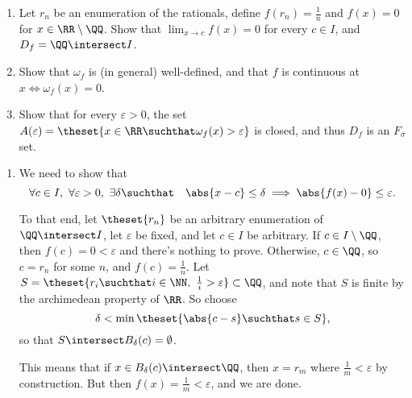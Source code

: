 \begin{problem}\hfill
\begin{enumerate}
  \item Let $r_n$ be an enumeration of the rationals, define $f(r_n) = \frac 1 n$ and $f(x) = 0$ for $x \in \RR\setminus\QQ$. Show that $\lim_{x \to c} f(x) = 0$ for every $c\in I$, and $D_f = \QQ \intersect I$.

  \item Show that $\omega_f$ is (in general) well-defined, and that $f$ is continuous at $x \iff \omega_f(x) = 0$.

  \item Show that for every $\varepsilon > 0$, the set $A(\varepsilon) = \theset{x\in\RR \suchthat \omega_f(x) > \varepsilon}$ is closed, and thus $D_f$ is an $F_\sigma$ set.
\end{enumerate}
\end{problem}


\begin{solution}\hfill
\begin{enumerate}
  \item We need to show that
    $$
    \forall c\in I, ~\forall\varepsilon > 0, ~\exists \delta \suchthat \quad \abs{x-c} \leq \delta \implies \abs{f(x) - 0} \leq \varepsilon.
    $$

    To that end, let $\theset{r_n}$ be an arbitrary enumeration of $\QQ \intersect I$, let $\varepsilon$ be fixed, and let $c \in I$ be arbitrary. If $c\in I\setminus\QQ$, then $f(c) = 0 < \varepsilon$ and there's nothing to prove. Otherwise, $c\in\QQ$, so $c = r_n$ for some $n$, and $f(c) = \frac 1 n$. Let $S = \theset{r_i \suchthat i \in \NN,~ \frac 1 i > \varepsilon} \subset \QQ$, and note that $S$ is finite by the archimedean property of $\RR$. So choose
    $$
    \delta < \min\theset{\abs{c - s} \suchthat s\in S},
    $$
    so that $S \intersect B_\delta(c) = \emptyset$.

    This means that if $x\in B_\delta(c) \intersect \QQ$, then $x = r_m$ where $\frac 1 m < \varepsilon$ by construction. But then $f(x) = \frac 1 m < \varepsilon$, and we are done.
\end{enumerate}
\end{solution}




